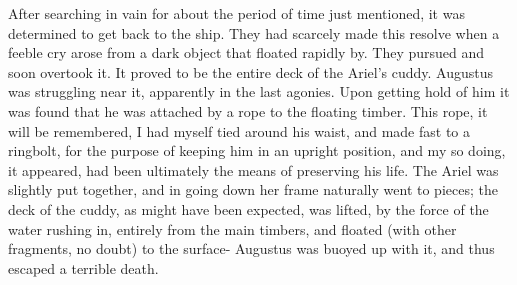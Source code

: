 After searching in vain for about the period of time just mentioned, it was
determined to get back to the ship. They had scarcely made this resolve when a
feeble cry arose from a dark object that floated rapidly by. They pursued and
soon overtook it. It proved to be the entire deck of the Ariel's cuddy. Augustus
was struggling near it, apparently in the last agonies. Upon getting hold of him
it was found that he was attached by a rope to the floating timber. This rope,
it will be remembered, I had myself tied around his waist, and made fast to a
ringbolt, for the purpose of keeping him in an upright position, and my so
doing, it appeared, had been ultimately the means of preserving his life. The
Ariel was slightly put together, and in going down her frame naturally went to
pieces; the deck of the cuddy, as might have been expected, was lifted, by the
force of the water rushing in, entirely from the main timbers, and floated (with
other fragments, no doubt) to the surface- Augustus was buoyed up with it, and
thus escaped a terrible death. 

